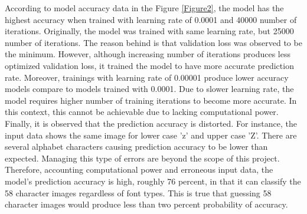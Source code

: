 According to model accuracy data in the Figure \ref{Figure2}, the model has the highest accuracy when trained
with learning rate of 0.0001 and 40000 number of iterations. Originally, the model was trained with same learning rate, but
25000 number of iterations. The reason behind is that validation loss was observed to be the minimum. However, although
increasing number of iterations produces less optimized validation loss, it trained the model to have more accurate
prediction rate.
\newline
\newline
\indent
Moreover, trainings with learning rate of 0.00001 produce lower accuracy models compare to models trained with 0.0001.
Due to slower learning rate, the model requires higher number of training iterations to become more accurate. In this
context, this cannot be achievable due to lacking computational power.
\newline
\newline
\indent
Finally, it is observed that the prediction accuracy is distorted. For instance, the input data shows the same image for
lower case 'z' and upper case 'Z'. There are several alphabet characters causing prediction accuracy to be lower than expected.
Managing this type of errors are beyond the scope of this project. Therefore, accounting computational power and erroneous input data,
the model's prediction accuracy is high, roughly 76 percent, in that it can classify the 58 character images regardless of font types.
This is true that guessing 58 character images would produce less than two percent probability of accuracy.


